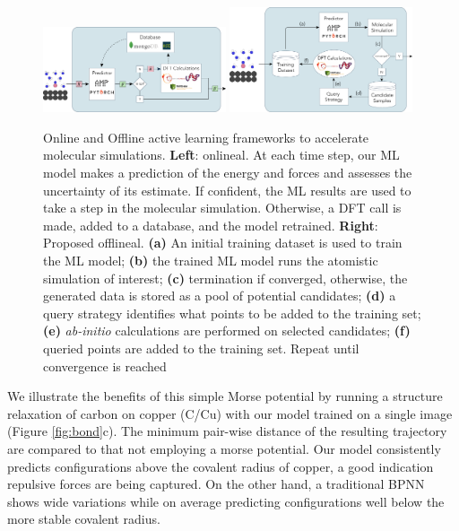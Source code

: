 \documentclass[%
 reprint,
 amsmath,amssymb,
 aps,
]{revtex4-2}
\begin{document}
\begin{figure}[ht!]
    \centering
    \includegraphics[width=0.48\textwidth]{figures/figure_2a.pdf}
    \includegraphics[width=0.48\textwidth]{figures/figure_2b.pdf}
    \caption{Online and Offline active learning frameworks to accelerate molecular simulations.
    \textbf{Left}: \gls{onlineal}. At each time step, our ML model makes a prediction of the energy and forces and assesses the uncertainty of its estimate. If confident, the ML results are used to take a step in the molecular simulation. Otherwise, a DFT call is made, added to a database, and the model retrained. \textbf{Right}: Proposed \gls{offlineal}.
    \textbf{(a)} An initial training dataset is used to train the ML model; \textbf{(b)} the trained ML model runs the atomistic simulation of interest; \textbf{(c)} termination if converged, otherwise, the generated data is stored as a pool of potential candidates; \textbf{(d)} a query strategy identifies what points to be added to the training set; \textbf{(e)} \textit{ab-initio} calculations are performed on selected candidates; \textbf{(f)} queried points are added to the training set. Repeat until convergence is reached}
    \label{fig:framework}
\end{figure}

We illustrate the benefits of this simple Morse potential by running a structure relaxation of carbon on copper (C/Cu) with our model trained on a single image (Figure \ref{fig:bond}c). The minimum pair-wise distance of the resulting trajectory are compared to that not employing a morse potential. Our model consistently predicts configurations above the covalent radius of copper, a good indication repulsive forces are being captured. On the other hand, a traditional BPNN shows wide variations while on average predicting configurations well below the more stable covalent radius.
\end{document}
